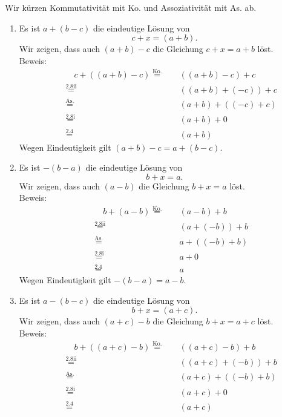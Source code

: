 \begin{lsg}
Wir kürzen Kommutativität mit Ko. und Assoziativität mit As. ab.
\begin{enumerate}[label=$\mathrm{(\roman*)}$, ref=$\mathrm{\roman*}$]
\item
    Es ist $ a+(b-c) $ die eindeutige L\"osung von 
    \[c+x =(a+b).\]
    Wir zeigen, dass auch $(a+b)-c$ die Gleichung $c+x =a+b$ l\"ost.\\
    Beweis:
    \begin{align*}
	    && \quad  c+((a+b)-c) \overset{\text{Ko.}}{=} & \quad ((a+b)-c)+c\\
    	&&\overset{\text{2.8ii}}{=} & \quad ((a+b)+(-c))+c\\
	    &&\overset{\text{As.}}{=} & \quad (a+b)+((-c)+c)\\
	    &&\overset{\text{2.8i}}{=} & \quad (a+b)+0\\
    	&&\overset{\text{2.4}}{=} & \quad (a+b)
\end{align*}
Wegen Eindeutigkeit gilt $(a+b)-c=a+(b-c)$.
\item
    Es ist $ -(b-a) $ die eindeutige L\"osung von 
    \[b+x =a.\]
	Wir zeigen, dass auch $(a-b)$ die Gleichung $b+x =a$ l\"ost.\\
	Beweis:
	\begin{align*}
		&& \quad  b+(a-b)\overset{\text{Ko.}}{=}& \quad  (a-b)+b\\
		&&\overset{\text{2.8ii}}{=} & \quad (a+(-b))+b\\
		&&\overset{\text{As.}}{=} & \quad a+((-b)+b)\\
		&&\overset{\text{2.8i}}{=} & \quad a +0\\
		&&\overset{\text{2.4}}{=} & \quad a
	\end{align*}
	Wegen Eindeutigkeit gilt $-(b-a)=a-b$.
\item
    Es ist $a-(b-c)$ die eindeutige L\"osung von 
	\[ b+x=(a+c). \]
	Wir zeigen, dass auch $(a+c)-b$ die Gleichung $b+x=a+c$ l\"ost.\\
	Beweis:
	\begin{align*}
		&& \quad b+((a+c)-b)\overset{\text{Ko.}}{=} & \quad ((a+c)-b)+b\\
		&&\overset{\text{2.8ii}}{=} & \quad ((a+c)+(-b))+b\\
		&&\overset{\text{As.}}{=} & \quad (a+c)+((-b)+b)\\
		&&\overset{\text{2.8i}}{=} & \quad (a+c)+0\\
		&&\overset{\text{2.4}}{=} & \quad (a+c)
	\end{align*}\\

\end{enumerate}
\end{lsg}
